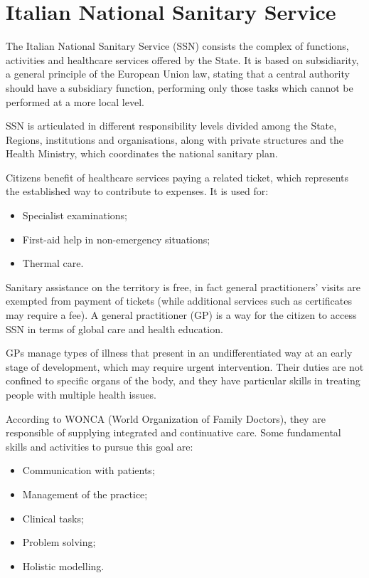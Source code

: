 \section{Italian National Sanitary Service}
The Italian National Sanitary Service (SSN) consists the complex of functions, activities and healthcare services offered by the State. It is based on subsidiarity, a general principle of the European Union law, stating that a central authority should have a subsidiary function, performing only those tasks which cannot be performed at a more local level\cite{oxford}.

SSN is articulated in different responsibility levels divided among the State, Regions, institutions and organisations, along with private structures and the Health Ministry, which coordinates the national sanitary plan.

Citizens benefit of healthcare services paying a related ticket\cite{ticket}, which represents the established way to contribute to expenses. It is used for:
\begin{itemize}
	\item Specialist examinations;
	\item First-aid help in non-emergency situations;
	\item Thermal care.
\end{itemize}

Sanitary assistance on the territory is free, in fact general practitioners' visits are exempted from payment of tickets (while additional services such as certificates may require a fee). A general practitioner (GP) is a way for the citizen to access SSN in terms of global care and health education.

GPs manage types of illness that present in an undifferentiated way at an early stage of development, which may require urgent intervention. Their duties are not confined to specific organs of the body, and they have particular skills in treating people with multiple health issues\cite{wonca2}. 

According to WONCA (World Organization of Family Doctors), they are responsible of supplying integrated and continuative care. Some fundamental skills and activities\cite{wonca2} to pursue this goal are:
\begin{itemize}
	\item Communication with patients;
	\item Management of the practice;
	\item Clinical tasks;
	\item Problem solving;
	\item Holistic modelling.
\end{itemize}

